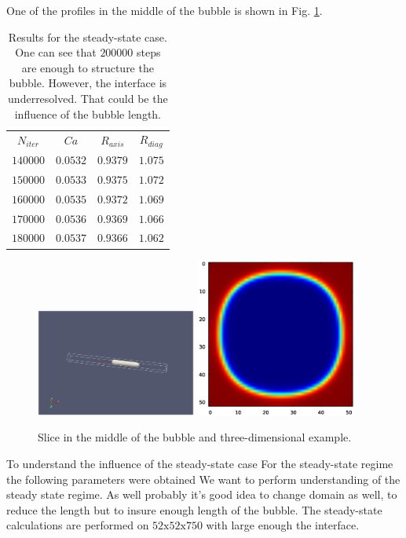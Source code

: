 \documentclass{article}
\begin{document}
One of the
profiles in
the middle of the bubble is shown in Fig. \ref{fig:steady:state:profile:example}.
\begin{table}
\begin{tabular}{|c|c|c|c|}
$N_{iter}$&$Ca$&$R_{axis}$&$R_{diag}$\\
$140000$&$0.0532$&$0.9379$&$1.075$\\
$150000$&$0.0533$&$0.9375$&$1.072$\\
$160000$&$0.0535$&$0.9372$&$1.069$\\
$170000$&$0.0536$&$0.9369$&$1.066$\\
$180000$&$0.0537$&$0.9366$&$1.062$\\
\end{tabular}
\caption{Results for the steady-state case. One can see that $200000$ steps are enough to structure
the bubble. However, the interface is underresolved. That could be the influence of the bubble
length.\label{table:steady:state}}
\end{table}
\begin{figure}
\includegraphics[width=0.47\textwidth]{Figures/bullet.eps}\hfill
\includegraphics[width=0.47\textwidth]{Figures/example_crossection.eps}\\
\caption{Slice in the middle of the bubble and
three-dimensional example. \label{fig:steady:state:profile:example}}
\end{figure}


To understand the influence of the steady-state case
For the steady-state regime the following parameters were obtained
We want to perform understanding of the steady state regime. As well probably it's good idea to
change domain as well, to reduce the length but to insure enough length of the bubble. The
steady-state calculations are performed on $52\mathrm{x}52\mathrm{x}750$ with large enough the
interface. 
\end{document}
